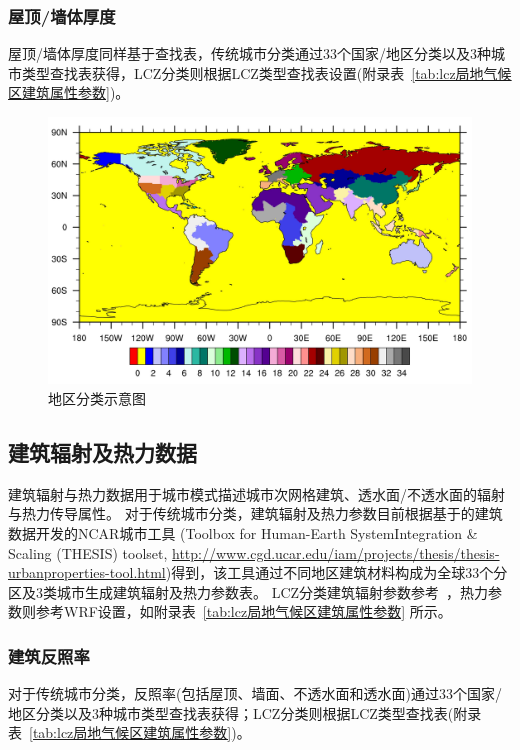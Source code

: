 \subsubsection{屋顶/墙体厚度}\label{屋顶/墙体厚度}
屋顶/墙体厚度同样基于查找表，传统城市分类通过33个国家/地区分类以及3种城市类型查找表获得，LCZ分类则根据LCZ类型查找表设置(附录表~\ref{tab:lcz局地气候区建筑属性参数})。

{
  \begin{figure}[htbp]
    \centering
    \includegraphics[width=.7\paperwidth]{Figures/基础数据/地区分类.jpg}
    \caption{地区分类示意图}
    \label{fig:地区分类}
  \end{figure}
}

\subsection{建筑辐射及热力数据}\label{建筑辐射及热力数据}
建筑辐射与热力数据用于城市模式描述城市次网格建筑、透水面/不透水面的辐射与热力传导属性。
对于传统城市分类，建筑辐射及热力参数目前根据\citet{oleson2020parameterization}基于\citet{jackson2010parameterization}的建筑数据开发的NCAR城市工具
(Toolbox for Human-Earth SystemIntegration \& Scaling (THESIS) toolset, \url{http://www.cgd.ucar.edu/iam/projects/thesis/thesis-urbanproperties-tool.html})得到，该工具通过不同地区建筑材料构成为全球33个分区及3类城市生成建筑辐射及热力参数表。
LCZ分类建筑辐射参数参考~\citet{stewart2014evaluation}，热力参数则参考WRF设置，如附录表~\ref{tab:lcz局地气候区建筑属性参数} 所示。

\subsubsection{建筑反照率}\label{建筑反照率}
对于传统城市分类，反照率(包括屋顶、墙面、不透水面和透水面)通过33个国家/地区分类以及3种城市类型查找表获得；LCZ分类则根据LCZ类型查找表(附录表~\ref{tab:lcz局地气候区建筑属性参数})。

